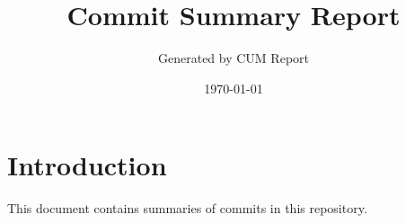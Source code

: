 \documentclass{article}
\title{Commit Summary Report}
\author{Generated by CUM Report}
\date{\today}
\begin{document}
\maketitle
\tableofcontents
\section{Introduction}
This document contains summaries of commits in this repository.
\end{document}
